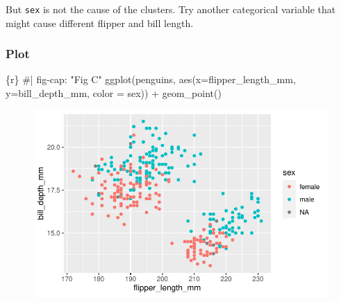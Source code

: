 \documentclass[
  letterpaper,
  DIV=11,
  numbers=noendperiod]{scrreprt}
\newenvironment{Shaded}{\begin{snugshade}}{\end{snugshade}}
\newcommand{\AttributeTok}[1]{\textcolor[rgb]{0.40,0.45,0.13}{#1}}
\newcommand{\CommentTok}[1]{\textcolor[rgb]{0.37,0.37,0.37}{#1}}
\newcommand{\FunctionTok}[1]{\textcolor[rgb]{0.28,0.35,0.67}{#1}}
\newcommand{\InformationTok}[1]{\textcolor[rgb]{0.37,0.37,0.37}{#1}}
\newcommand{\NormalTok}[1]{\textcolor[rgb]{0.00,0.23,0.31}{#1}}
\newcommand{\SpecialCharTok}[1]{\textcolor[rgb]{0.37,0.37,0.37}{#1}}
\begin{document}
\begin{tcolorbox}[enhanced jigsaw, breakable, colback=white, bottomrule=.15mm, leftrule=.75mm, colframe=quarto-callout-important-color-frame, arc=.35mm, rightrule=.15mm, toprule=.15mm, left=2mm, opacityback=0]
But \texttt{sex} is not the cause of the clusters. Try another
categorical variable that might cause different flipper and bill length.
\end{tcolorbox}

\begin{tcolorbox}[enhanced jigsaw, breakable, colback=white, bottomrule=.15mm, leftrule=.75mm, colframe=quarto-callout-note-color-frame, arc=.35mm, rightrule=.15mm, toprule=.15mm, left=2mm, opacityback=0]

\hypertarget{plot-1}{%
\subsubsection*{Plot}\label{plot-1}}

\begin{Shaded}
\begin{Highlighting}[]
\InformationTok{\textasciigrave{}\textasciigrave{}\textasciigrave{}\{r\}}
\CommentTok{\#| fig{-}cap: "Fig C"}
\FunctionTok{ggplot}\NormalTok{(penguins, }\FunctionTok{aes}\NormalTok{(}\AttributeTok{x=}\NormalTok{flipper\_length\_mm, }\AttributeTok{y=}\NormalTok{bill\_depth\_mm, }\AttributeTok{color =}\NormalTok{ sex)) }\SpecialCharTok{+}
  \FunctionTok{geom\_point}\NormalTok{()}
\InformationTok{\textasciigrave{}\textasciigrave{}\textasciigrave{}}
\end{Highlighting}
\end{Shaded}

\begin{figure}[H]

{\centering \includegraphics{03-content_files/figure-pdf/unnamed-chunk-8-1.pdf}

}
\end{figure}
\end{tcolorbox}
\end{document}
